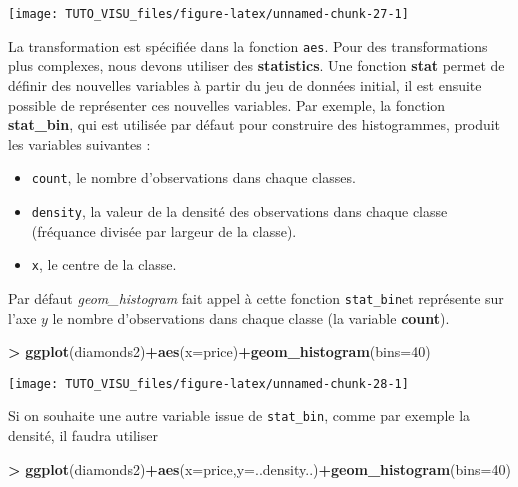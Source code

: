 \documentclass[]{book}
\newenvironment{Shaded}{\begin{snugshade}}{\end{snugshade}}
\newcommand{\DataTypeTok}[1]{\textcolor[rgb]{0.13,0.29,0.53}{#1}}
\newcommand{\DecValTok}[1]{\textcolor[rgb]{0.00,0.00,0.81}{#1}}
\newcommand{\KeywordTok}[1]{\textcolor[rgb]{0.13,0.29,0.53}{\textbf{#1}}}
\newcommand{\NormalTok}[1]{#1}
\newcommand{\OperatorTok}[1]{\textcolor[rgb]{0.81,0.36,0.00}{\textbf{#1}}}
\newcommand{\StringTok}[1]{\textcolor[rgb]{0.31,0.60,0.02}{#1}}
\providecommand{\tightlist}{%
  \setlength{\itemsep}{0pt}\setlength{\parskip}{0pt}}
\theoremstyle{definition}
\theoremstyle{definition}
\theoremstyle{definition}
\theoremstyle{remark}
\begin{document}
\begin{center}\texttt{[image: TUTO\_VISU\_files/figure-latex/unnamed-chunk-27-1]} \end{center}

La transformation est spécifiée dans la fonction \texttt{aes}. Pour des transformations plus complexes, nous devons utiliser des \textbf{statistics}. Une fonction \textbf{stat} permet de définir des nouvelles variables à partir du jeu de données initial, il est ensuite possible de représenter ces nouvelles variables.
Par exemple, la fonction \textbf{stat\_bin}, qui est utilisée par défaut pour construire des histogrammes, produit les variables suivantes :

\begin{itemize}
\tightlist
\item
  \texttt{count}, le nombre d'observations dans chaque classes.
\item
  \texttt{density}, la valeur de la densité des observations dans chaque classe (fréquance divisée par largeur de la classe).
\item
  \texttt{x}, le centre de la classe.
\end{itemize}

Par défaut \emph{geom\_histogram} fait appel à cette fonction \texttt{stat\_bin}et représente sur l'axe \(y\) le nombre d'observations dans chaque classe (la variable \textbf{count}).

\begin{Shaded}
\begin{Highlighting}[]
\OperatorTok{>}\StringTok{ }\KeywordTok{ggplot}\NormalTok{(diamonds2)}\OperatorTok{+}\KeywordTok{aes}\NormalTok{(}\DataTypeTok{x=}\NormalTok{price)}\OperatorTok{+}\KeywordTok{geom_histogram}\NormalTok{(}\DataTypeTok{bins=}\DecValTok{40}\NormalTok{)}
\end{Highlighting}
\end{Shaded}

\begin{center}\texttt{[image: TUTO\_VISU\_files/figure-latex/unnamed-chunk-28-1]} \end{center}

Si on souhaite une autre variable issue de \texttt{stat\_bin}, comme par exemple la densité, il faudra utiliser

\begin{Shaded}
\begin{Highlighting}[]
\OperatorTok{>}\StringTok{ }\KeywordTok{ggplot}\NormalTok{(diamonds2)}\OperatorTok{+}\KeywordTok{aes}\NormalTok{(}\DataTypeTok{x=}\NormalTok{price,}\DataTypeTok{y=}\NormalTok{..density..)}\OperatorTok{+}\KeywordTok{geom_histogram}\NormalTok{(}\DataTypeTok{bins=}\DecValTok{40}\NormalTok{)}
\end{Highlighting}
\end{Shaded}
\end{document}
